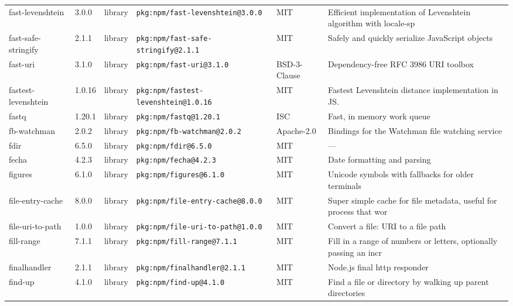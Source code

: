 \documentclass[11pt,a4paper]{article}
\begin{document}
\begin{longtable}{|p{4cm}|p{2cm}|p{1.6cm}|p{5cm}|p{1.5cm}|p{3.5cm}|}
\raggedright fast-levenshtein & 3.0.0 & library & \small\texttt{pkg:npm/fast-levenshtein@3.0.0} & MIT & \small Efficient implementation of Levenshtein algorithm  with locale-sp \\
\raggedright fast-safe-stringify & 2.1.1 & library & \small\texttt{pkg:npm/fast-safe-stringify@2.1.1} & MIT & \small Safely and quickly serialize JavaScript objects \\
\raggedright fast-uri & 3.1.0 & library & \small\texttt{pkg:npm/fast-uri@3.1.0} & BSD-3-Clause & \small Dependency-free RFC 3986 URI toolbox \\
\raggedright fastest-levenshtein & 1.0.16 & library & \small\texttt{pkg:npm/fastest-levenshtein@1.0.16} & MIT & \small Fastest Levenshtein distance implementation in JS. \\
\raggedright fastq & 1.20.1 & library & \small\texttt{pkg:npm/fastq@1.20.1} & ISC & \small Fast, in memory work queue \\
\raggedright fb-watchman & 2.0.2 & library & \small\texttt{pkg:npm/fb-watchman@2.0.2} & Apache-2.0 & \small Bindings for the Watchman file watching service \\
\raggedright fdir & 6.5.0 & library & \small\texttt{pkg:npm/fdir@6.5.0} & MIT & \small — \\
\raggedright fecha & 4.2.3 & library & \small\texttt{pkg:npm/fecha@4.2.3} & MIT & \small Date formatting and parsing \\
\raggedright figures & 6.1.0 & library & \small\texttt{pkg:npm/figures@6.1.0} & MIT & \small Unicode symbols with fallbacks for older terminals \\
\raggedright file-entry-cache & 8.0.0 & library & \small\texttt{pkg:npm/file-entry-cache@8.0.0} & MIT & \small Super simple cache for file metadata, useful for process that wor \\
\raggedright file-uri-to-path & 1.0.0 & library & \small\texttt{pkg:npm/file-uri-to-path@1.0.0} & MIT & \small Convert a file: URI to a file path \\
\raggedright fill-range & 7.1.1 & library & \small\texttt{pkg:npm/fill-range@7.1.1} & MIT & \small Fill in a range of numbers or letters, optionally passing an incr \\
\raggedright finalhandler & 2.1.1 & library & \small\texttt{pkg:npm/finalhandler@2.1.1} & MIT & \small Node.js final http responder \\
\raggedright find-up & 4.1.0 & library & \small\texttt{pkg:npm/find-up@4.1.0} & MIT & \small Find a file or directory by walking up parent directories \\

\end{longtable}
\end{document}
